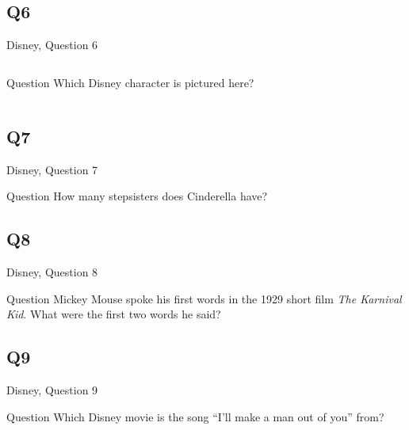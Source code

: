\documentclass[11pt]{beamer}
\begin{document}
\subsection*{Q6}
\begin{frame}[t]{Disney, Question 6}
\begin{columns}[T,totalwidth=\linewidth]
\begin{column}{0.32\linewidth}
\begin{block}{Question}
Which Disney character is pictured here?
\end{block}
\end{column}
\begin{column}{0.65\linewidth}
\begin{center}
\texttt{[image: \{Images/geppetto]}.jpg}
\end{center}
\end{column}
\end{columns}
\end{frame}
\subsection*{Q7}
\begin{frame}[t]{Disney, Question 7}
\begin{block}{Question}
How many stepsisters does Cinderella have?
\end{block}
\end{frame}
\subsection*{Q8}
\begin{frame}[t]{Disney, Question 8}
\begin{block}{Question}
Mickey Mouse spoke his first words in the 1929 short film \emph{The Karnival Kid}. What were the first two words he said?
\end{block}
\end{frame}
\subsection*{Q9}
\begin{frame}[t]{Disney, Question 9}
\begin{block}{Question}
Which Disney movie is the song ``I'll make a man out of you'' from?
\end{block}
\end{frame}
\end{document}
